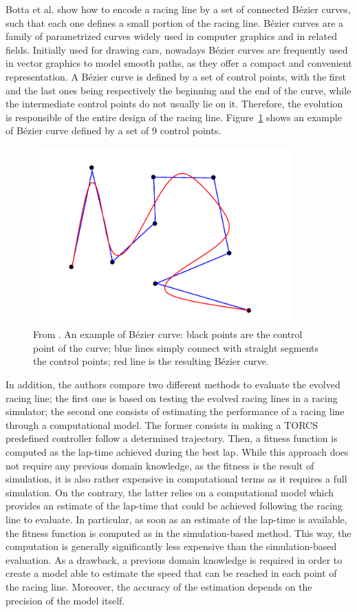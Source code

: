 Botta et al. \cite{botta} show how to encode a racing line by a set of connected B\'{e}zier curves, such that each one defines a small portion of the racing line. B\'{e}zier curves are a family of parametrized curves widely used in computer graphics and in related fields. Initially used for drawing cars, nowadays B\'{e}zier curves are frequently used in vector graphics to model smooth paths, as they offer a compact and convenient representation.
A B\'{e}zier curve is defined by a set of control points, with the first and the last ones being respectively the beginning and the end of the curve, while the intermediate control points do not usually lie on it. Therefore, the evolution is responsible of the entire design of the racing line. Figure~\ref{fig:bezier} shows an example of Bézier curve defined by
a set of 9 control points.
  \begin{figure}
    \centering
 	  \captionsetup{width=10cm}
      \includegraphics[width=10cm]{./img/bezier}
     \caption{From \cite{botta}. An example of B\'{e}zier curve: black points are the control point of the curve; blue lines simply connect with straight segments the control points; red line is the resulting B\'{e}zier curve.}
   \label{fig:bezier}
  \end{figure}
In addition, the authors compare two different methods to evaluate the evolved racing line; the first one is based on testing the evolved racing lines in a racing simulator; the second one consists of estimating the performance of a racing line through a computational model.
The former consists in making a TORCS predefined controller follow a determined trajectory. Then, a fitness function is computed as the lap-time achieved during the best lap. While this approach does not require any previous domain knowledge, as the fitness is the result of simulation, it is also rather expensive in computational terms as it requires a full simulation. 
On the contrary, the latter relies on a computational model which provides an estimate of the lap-time
that could be achieved following the racing line to evaluate. In particular, as soon as an estimate of the lap-time is available, the fitness function is computed as in the simulation-based method. This way, the computation is generally significantly less expensive than the simulation-based evaluation. As a drawback, a previous domain knowledge is required in order to create a model able to estimate the speed that can be reached in each point of the racing line. Moreover, the accuracy of the estimation depends on the precision of the model itself.

